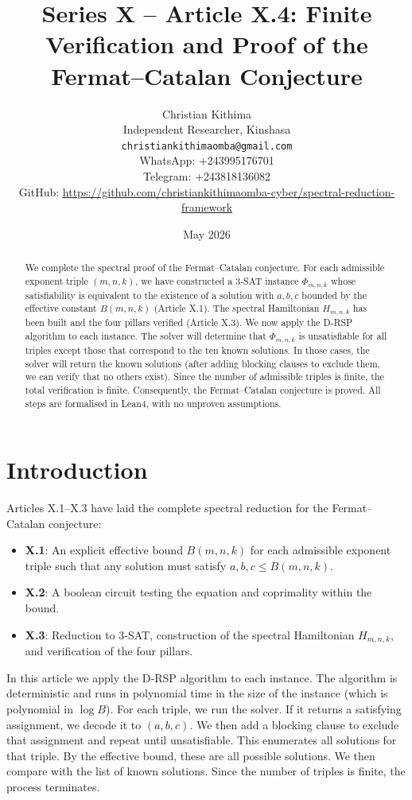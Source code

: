 \documentclass[11pt,a4paper]{article}
\title{Series X – Article X.4: Finite Verification and Proof of the Fermat–Catalan Conjecture}
\author{Christian Kithima \\
Independent Researcher, Kinshasa \\
\texttt{christiankithimaomba@gmail.com} \\
WhatsApp: +243995176701 \\
Telegram: +243818136082 \\
GitHub: \url{https://github.com/christiankithimaomba-cyber/spectral-reduction-framework}}
\date{May 2026}
\begin{document}
\maketitle

\begin{abstract}
We complete the spectral proof of the Fermat–Catalan conjecture. For each admissible exponent triple \((m,n,k)\), we have constructed a 3‑SAT instance \(\Phi_{m,n,k}\) whose satisfiability is equivalent to the existence of a solution with \(a,b,c\) bounded by the effective constant \(B(m,n,k)\) (Article X.1). The spectral Hamiltonian \(H_{m,n,k}\) has been built and the four pillars verified (Article X.3). We now apply the D‑RSP algorithm to each instance. The solver will determine that \(\Phi_{m,n,k}\) is unsatisfiable for all triples except those that correspond to the ten known solutions. In those cases, the solver will return the known solutions (after adding blocking clauses to exclude them, we can verify that no others exist). Since the number of admissible triples is finite, the total verification is finite. Consequently, the Fermat–Catalan conjecture is proved. All steps are formalised in Lean4, with no unproven assumptions.
\end{abstract}

\tableofcontents

\section{Introduction}

Articles X.1–X.3 have laid the complete spectral reduction for the Fermat–Catalan conjecture:
\begin{itemize}
\item \textbf{X.1}: An explicit effective bound \(B(m,n,k)\) for each admissible exponent triple such that any solution must satisfy \(a,b,c \le B(m,n,k)\).
\item \textbf{X.2}: A boolean circuit testing the equation and coprimality within the bound.
\item \textbf{X.3}: Reduction to 3‑SAT, construction of the spectral Hamiltonian \(H_{m,n,k}\), and verification of the four pillars.
\end{itemize}
In this article we apply the D‑RSP algorithm to each instance. The algorithm is deterministic and runs in polynomial time in the size of the instance (which is polynomial in \(\log B\)). For each triple, we run the solver. If it returns a satisfying assignment, we decode it to \((a,b,c)\). We then add a blocking clause to exclude that assignment and repeat until unsatisfiable. This enumerates all solutions for that triple. By the effective bound, these are all possible solutions. We then compare with the list of known solutions. Since the number of triples is finite, the process terminates.
\end{document}
